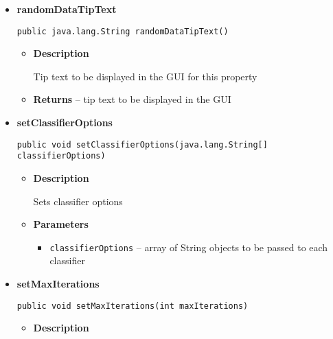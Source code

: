 \documentclass[11pt,a4paper]{report}
\begin{document}
{{{{{\begin{itemize}
{\begin{itemize}
{Retrains each of the classifiers, then attempts to impute missing data in a copy of the training data. Does not iterate again if the results of current iteration match the results of the previous iteration, or the max number of iterations has been reached.
}
\item{{\bf  Returns} -- 
true if another iteration should be performed, otherwise false. 
}%
\end{itemize}
}%
\item{ 
{\bf  randomDataTipText}\\
\begin{lstlisting}[frame=none]
public java.lang.String randomDataTipText()\end{lstlisting} %
\begin{itemize}
\item{
{\bf  Description}

Tip text to be displayed in the GUI for this property
}
\item{{\bf  Returns} -- 
tip text to be displayed in the GUI 
}%
\end{itemize}
}%
\item{ 
{\bf  setClassifierOptions}\\
\begin{lstlisting}[frame=none]
public void setClassifierOptions(java.lang.String[] classifierOptions)\end{lstlisting} %
\begin{itemize}
\item{
{\bf  Description}

Sets classifier options
}
\item{
{\bf  Parameters}
  \begin{itemize}
   \item{
\texttt{classifierOptions} -- array of String objects to be passed to each classifier}
  \end{itemize}
}%
\end{itemize}
}%
\item{ 
{\bf  setMaxIterations}\\
\begin{lstlisting}[frame=none]
public void setMaxIterations(int maxIterations)\end{lstlisting} %
\begin{itemize}
\item{
{\bf  Description}

}
\end{itemize}}
\end{itemize}}}}}}
\end{document}
